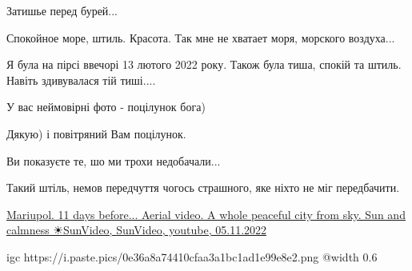  
 
 
 
 

\qqSecCmt


Затишье перед бурей...


Спокойное море, штиль. Красота. Так мне не хватает моря, морского воздуха...


Я була на пірсі ввечорі 13 лютого 2022 року. Також була тиша, спокій та штиль.
Навіть здивувалася тій тиші....


У вас неймовірні фото - поцілунок бога)


Дякую) і повітряний Вам поцілунок.


Ви показуєте те, шо ми трохи недобачали...


Такий штіль, немов передчуття чогось страшного, яке ніхто не міг передбачити.


\href{https://www.youtube.com/watch?v=715nbPyyM78}{%
Mariupol. 11 days before... Aerial video. A whole peaceful city from sky. Sun and calmness ☀SunVideo, %
SunVideo, youtube, 05.11.2022%
}

\ifcmt
  igc https://i.paste.pics/0e36a8a74410cfaa3a1bc1ad1e99e8e2.png
	@width 0.6
\fi

